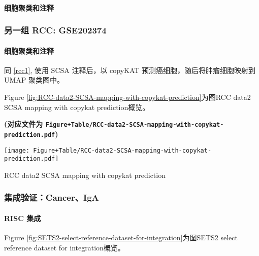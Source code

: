 \documentclass[
]{article}
\begin{document}
\hypertarget{ux7ec6ux80deux805aux7c7bux548cux6ce8ux91ca-5}{%
\paragraph{细胞聚类和注释}\label{ux7ec6ux80deux805aux7c7bux548cux6ce8ux91ca-5}}

\hypertarget{ux53e6ux4e00ux7ec4-rcc-gse202374}{%
\subsubsection{另一组 RCC: GSE202374}\label{ux53e6ux4e00ux7ec4-rcc-gse202374}}

\hypertarget{ux7ec6ux80deux805aux7c7bux548cux6ce8ux91ca-6}{%
\paragraph{细胞聚类和注释}\label{ux7ec6ux80deux805aux7c7bux548cux6ce8ux91ca-6}}

同 \ref{rcc1}, 使用 SCSA 注释后，以 copyKAT 预测癌细胞，随后将肿瘤细胞映射到 UMAP 聚类图中。

Figure \ref{fig:RCC-data2-SCSA-mapping-with-copykat-prediction}为图RCC data2 SCSA mapping with copykat prediction概览。

\textbf{(对应文件为 \texttt{Figure+Table/RCC-data2-SCSA-mapping-with-copykat-prediction.pdf})}

\def\@captype{figure}
\begin{center}
\texttt{[image: Figure+Table/RCC-data2-SCSA-mapping-with-copykat-prediction.pdf]}
\caption{RCC data2 SCSA mapping with copykat prediction}\label{fig:RCC-data2-SCSA-mapping-with-copykat-prediction}
\end{center}

\hypertarget{ux96c6ux6210ux9a8cux8bc1canceriga}{%
\subsubsection{集成验证：Cancer、IgA}\label{ux96c6ux6210ux9a8cux8bc1canceriga}}

\hypertarget{risc-ux96c6ux6210}{%
\paragraph{RISC 集成}\label{risc-ux96c6ux6210}}

Figure \ref{fig:SETS2-select-reference-dataset-for-integration}为图SETS2 select reference dataset for integration概览。
\end{document}
